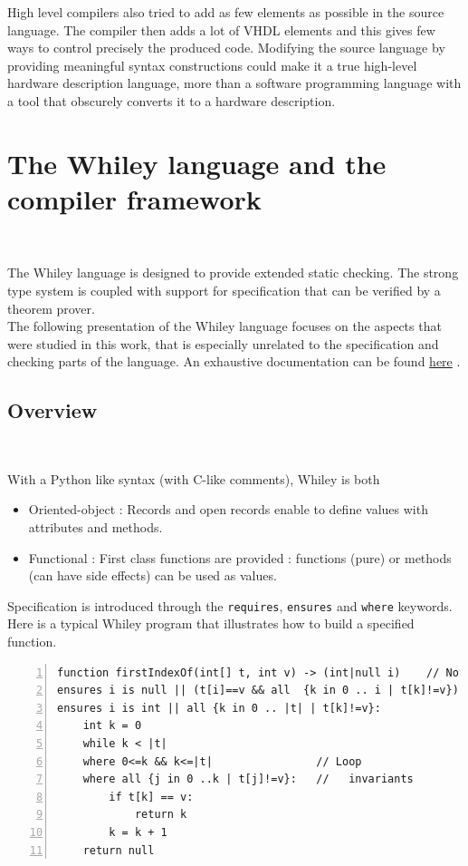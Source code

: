 \documentclass[10pt,a4paper]{article}
\renewcommand{\indent}{~\\\vspace{-.8cm}}
\newcommand{\whileyLine}{\lstinline[language=Whiley,basicstyle=\normalsize\ttfamily]}
\begin{document}
High level compilers also tried to add as few elements as possible in the source language. The compiler then adds a lot of VHDL elements and this gives few ways to control precisely  the produced code. Modifying the source language by providing meaningful syntax constructions could make it a true high-level hardware description language, more than a software programming language with a tool that obscurely converts it to a hardware description.


\section{The Whiley language and the compiler framework}
\indent

The Whiley language is designed to provide extended static checking. The strong type system is coupled with support for specification that can be verified by a theorem prover.\\ 

The following presentation of the Whiley language focuses on the aspects that were studied in this work, that is especially unrelated to the specification and checking parts of the language. An exhaustive documentation can be found \href{http://www.whiley.org/}{here} \cite{WhileySpec}.


\subsection{Overview}\indent

With a Python like syntax (with C-like comments), Whiley is both
\begin{itemize}
\item Oriented-object : Records and open records enable to define values with attributes and methods.
\item Functional : First class functions are provided : functions (pure) or methods (can have side effects) can be used as values.
\end{itemize}

Specification is introduced through the \whileyLine{requires}, \whileyLine{ensures} and \whileyLine{where} keywords. Here is a typical Whiley program that illustrates how to build a specified function.

\begin{lstlisting}[language=Whiley,numbers=left]
function firstIndexOf(int[] t, int v) -> (int|null i)    // No pre-conditions
ensures i is null || (t[i]==v && all  {k in 0 .. i | t[k]!=v}) // Post-
ensures i is int || all {k in 0 .. |t| | t[k]!=v}:             //  conditions
    int k = 0
    while k < |t| 
    where 0<=k && k<=|t|                // Loop
    where all {j in 0 ..k | t[j]!=v}:   //   invariants
        if t[k] == v:
            return k
        k = k + 1
    return null
\end{lstlisting}
\end{document}
